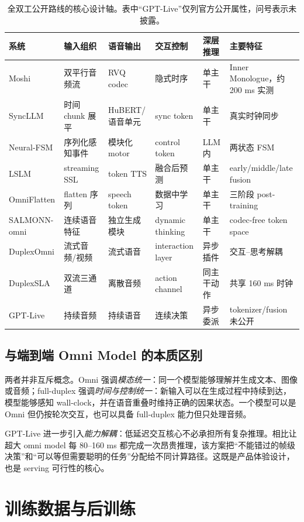 \documentclass[UTF8,fontset=none,a4paper,10pt]{ctexart}
\begin{document}
\begin{table}[H]
\centering\scriptsize
\setlength{\tabcolsep}{3pt}
\caption{全双工公开路线的核心设计轴。表中“GPT-Live”仅列官方公开属性，问号表示未披露。}
\begin{tabularx}{\textwidth}{lXXXXX}
\toprule
系统 & 输入组织 & 语音输出 & 交互控制 & 深层推理 & 主要特征 \\
\midrule
Moshi & 双平行音频流 & RVQ codec & 隐式时序 & 单主干 & Inner Monologue，约 200 ms 实测 \\
SyncLLM & 时间 chunk 展平 & HuBERT/语音单元 & sync token & 单主干 & 真实时钟同步 \\
Neural-FSM & 序列化感知事件 & 模块化 motor & control token & LLM 内 & 两状态 FSM \\
LSLM & streaming SSL & token TTS & 融合后预测 & 单主干 & early/middle/late fusion \\
OmniFlatten & flatten 序列 & speech token & 数据中学习 & 单主干 & 三阶段 post-training \\
SALMONN-omni & 连续语音特征 & 独立生成模块 & dynamic thinking & 单主干 & codec-free token space \\
DuplexOmni & 流式音频/视频 & 流式语音 & interaction layer & 异步插件 & 交互--思考解耦 \\
DuplexSLA & 双流三通道 & 离散音频 & action channel & 同主干动作 & 共享 160 ms 时钟 \\
GPT-Live & 持续音频 & 持续语音 & 连续决策 & 异步委派 & tokenizer/fusion 未公开 \\
\bottomrule
\end{tabularx}
\end{table}

\subsection{与端到端 Omni Model 的本质区别}

两者并非互斥概念。Omni 强调\emph{模态统一}：同一个模型能够理解并生成文本、图像或音频；full-duplex 强调\emph{时间与控制统一}：新输入可以在生成过程中持续到达，模型能够感知 wall-clock，并在语音重叠时维持正确的因果状态。一个模型可以是 Omni 但仍按轮次交互，也可以具备 full-duplex 能力但只处理音频。

GPT-Live 进一步引入\emph{能力解耦}：低延迟交互核心不必承担所有复杂推理。相比让超大 omni model 每 80--160 ms 都完成一次昂贵推理，该方案把“不能错过的帧级决策”和“可以等但需要聪明的任务”分配给不同计算路径。这既是产品体验设计，也是 serving 可行性的核心。

\section{训练数据与后训练}
\end{document}
